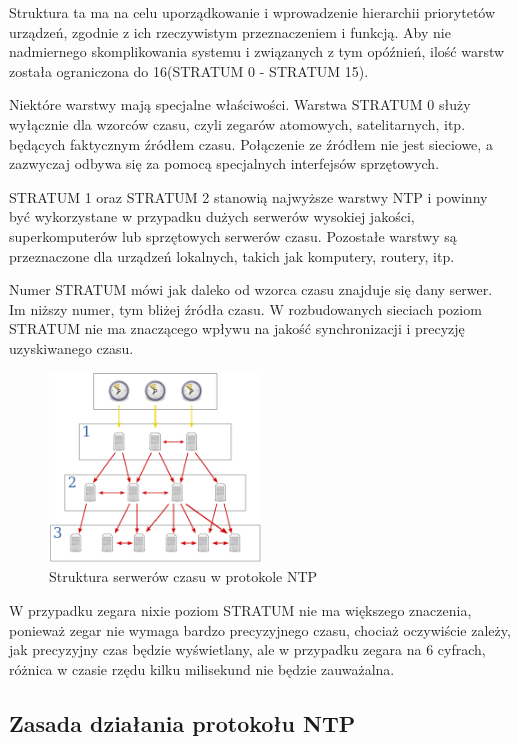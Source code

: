 \documentclass[../main.tex]{subfiles}
\begin{document}
Struktura ta ma na celu uporządkowanie i wprowadzenie hierarchii priorytetów urządzeń, zgodnie z ich rzeczywistym przeznaczeniem i funkcją. 
Aby nie nadmiernego skomplikowania systemu i związanych z tym opóźnień, ilość warstw została ograniczona do 16(STRATUM 0 - STRATUM 15).

Niektóre warstwy mają specjalne właściwości. Warstwa STRATUM 0 służy wyłącznie dla wzorców czasu, czyli zegarów atomowych, satelitarnych, itp. będących faktycznym źródłem czasu.
Połączenie ze źródłem nie jest sieciowe, a zazwyczaj odbywa się za pomocą specjalnych interfejsów sprzętowych.

STRATUM 1 oraz STRATUM 2 stanowią najwyższe warstwy NTP i powinny być wykorzystane w przypadku dużych serwerów
wysokiej jakości, superkomputerów lub sprzętowych serwerów czasu.
Pozostałe warstwy są przeznaczone dla urządzeń lokalnych, takich jak komputery, routery, itp.

Numer STRATUM mówi jak daleko od wzorca czasu znajduje się dany serwer. Im niższy numer, tym bliżej źródła czasu. 
W rozbudowanych sieciach poziom STRATUM nie ma znaczącego wpływu na jakość synchronizacji i precyzję uzyskiwanego czasu.

\begin{figure}[H]
  \centering
  \includegraphics[width=0.5\textwidth]{serwers.png}
  \caption{Struktura serwerów czasu w protokole NTP\cite{st:serwerczasu-jpg}}
\end{figure}

W przypadku zegara nixie poziom STRATUM nie ma większego znaczenia, ponieważ zegar nie wymaga bardzo precyzyjnego czasu, chociaż oczywiście zależy,
jak precyzyjny czas będzie wyświetlany, ale w przypadku zegara na 6 cyfrach, różnica w czasie rzędu kilku milisekund nie będzie zauważalna.

\subsection{Zasada działania protokołu NTP}
\end{document}
